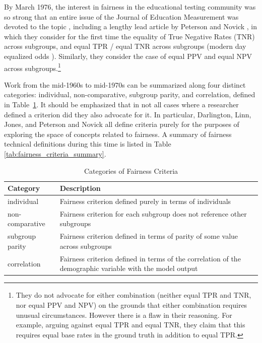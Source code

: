 \documentclass[sigconf,letterpaper,9pt]{acmart}
\begin{document}
By March  1976, the interest in fairness in the educational testing community was
so strong that an entire issue of the Journal of Education Measurement was devoted
to the topic \cite{jem_13_1}, including a lengthy lead article 
by Peterson and Novick \cite{petersen1976evaluation}, in which they consider for the first time the equality of
True Negative Rates (TNR) across subgroups, and  equal TPR / equal TNR across subgroups (modern day equalized odds \cite{Hardtetal2016equality}).
Similarly, they consider the case of equal PPV and equal NPV across subgroups.\footnote{
They do not advocate for either combination (neither equal TPR and TNR, nor 
equal PPV and NPV) on the grounds that
either combination requires unusual circumstances. However there is a flaw in their reasoning. For example, arguing against equal TPR and equal TNR, they claim that this requires equal base rates in the ground truth in addition to equal TPR.}

Work from the mid-1960s to mid-1970s
can be summarized along four distinct categories: {\sc individual}, {\sc non-comparative}, {\sc subgroup parity}, and {\sc correlation}, defined in Table~\ref{tab:criteria_categories}.
 It should be emphasized that in not all cases where a researcher defined a
criterion did they also advocate for it. In particular, Darlington, Linn, Jones, 
and Peterson and Novick all define criteria purely for the purposes of exploring
the space of concepts related to fairness.  A summary of fairness technical definitions during this time is listed in Table \ref{tab:fairness_criteria_summary}.

\begin{table}
\begin{tabular}{lp{5cm}}
\toprule
\bf Category & \bf Description \\
\bottomrule
{\sc individual} & Fairness criterion defined purely in terms of individuals \\
\hline
{\sc non-comparative} & Fairness criterion for each subgroup does not reference other subgroups \\
\hline
{\sc subgroup parity} & Fairness criterion defined in terms of parity
of some value across subgroups \\
\hline
{\sc correlation} & Fairness criterion defined in terms of the
correlation of the demographic variable with the model output \\
\bottomrule
\end{tabular}
\caption{Categories of Fairness Criteria}
\label{tab:criteria_categories}
\vspace{-2em}
\end{table}
\end{document}
